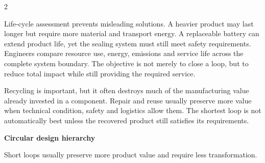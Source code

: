 \begin{multicols}{2}
\begin{ecarticle}
Life-cycle assessment prevents misleading solutions. A heavier product may last longer but require
more material and transport energy. A replaceable battery can extend product life, yet the sealing
system must still meet safety requirements. Engineers compare resource use, energy, emissions and
service life across the complete system boundary. The objective is not merely to close a loop, but to
reduce total impact while still providing the required service.
\end{ecarticle}

\begin{tcolorbox}[title=\sffamily\bfseries Engineering Insight,colback=yellow!10,colframe=ECOrange]
Recycling is important, but it often destroys much of the manufacturing value already invested in a
component. Repair and reuse usually preserve more value when technical condition, safety and logistics
allow them. The shortest loop is not automatically best unless the recovered product still satisfies
its requirements.
\end{tcolorbox}

\begin{engineeringfocus}
\textbf{Circular design hierarchy}
\begin{center}
\end{center}
Short loops usually preserve more product value and require less transformation.
\end{engineeringfocus}


\end{multicols}
